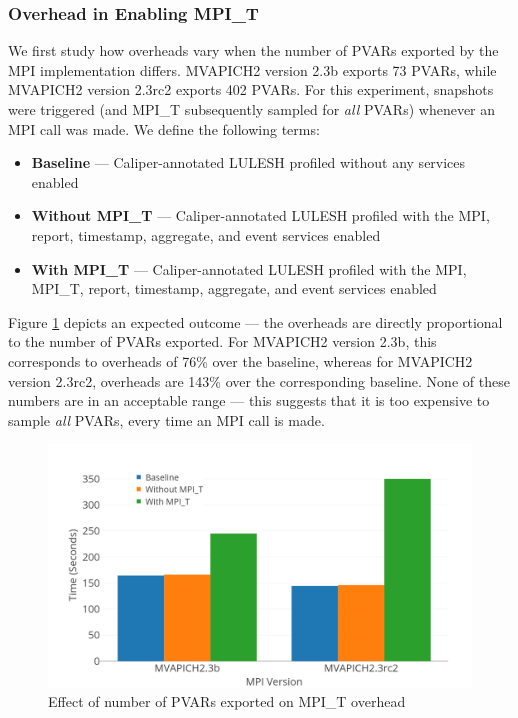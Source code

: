 \subsubsection{Overhead in Enabling MPI\_T}
We first study how overheads vary when the number of PVARs exported by the MPI implementation differs. MVAPICH2 version 2.3b exports 73 PVARs, while MVAPICH2 version 2.3rc2 exports 402 PVARs. For this experiment, snapshots were triggered (and MPI\_T subsequently sampled for \textit{all} PVARs) whenever an MPI call was made. We define the following terms:
\begin{itemize}
\item \textbf{Baseline} --- Caliper-annotated LULESH profiled without any services enabled
\item \textbf{Without MPI\_T} --- Caliper-annotated LULESH profiled with the MPI, report, timestamp, aggregate, and event services enabled
\item \textbf{With MPI\_T} --- Caliper-annotated LULESH profiled with the MPI, MPI\_T, report, timestamp, aggregate, and event services enabled
\end{itemize}
Figure \ref{fig:cali-overhead-version} depicts an expected outcome --- the overheads are directly proportional to the number of PVARs exported. For MVAPICH2 version 2.3b, this corresponds to overheads of 76\% over the baseline, whereas for MVAPICH2 version 2.3rc2, overheads are 143\% over the corresponding baseline. None of these numbers are in an acceptable range --- this suggests that it is too expensive to sample \textit{all} PVARs, every time an MPI call is made.
\begin{center}
	\begin{figure}[bp!]
         \centering
  \captionsetup{justification=centering}
		\includegraphics[scale=0.8, width=\columnwidth, keepaspectratio]{figures/CALIPER_overheads_version}
		\caption{Effect of number of PVARs exported on MPI\_T overhead}
		\label{fig:cali-overhead-version}
	\end{figure}
\end{center}

